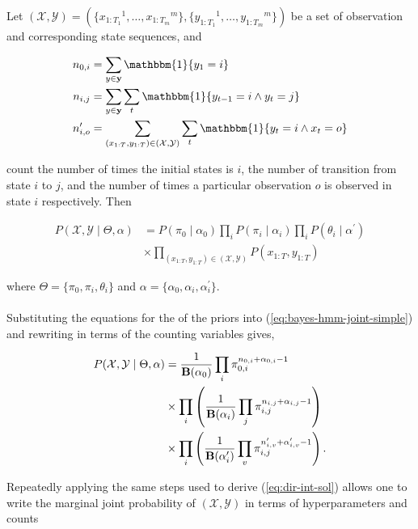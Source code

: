 \documentclass[12pt]{report}
\newcommand{\p}[0]{\prime}
\newcommand{\1}[0]{\mathbbm{1}}
\newcommand{\Bf}[0]{\text{\textbf{B}}}
\newcommand{\seq}[3]{\ensuremath{#1_{{#2}:{#3}}}}
\begin{document}
Let $(\mathcal{X}, \mathcal{Y}) = (\{\seq{x}{1}{T_1}^1, \ldots, \seq{x}{1}{T_m}^m\},
\{\seq{y}{1}{T_1}^1, \ldots, \seq{y}{1}{T_m}^m\})$ be a set of
observation and corresponding state sequences, and

\begin{align*}
    n_{0, i} &= \sum_{y \in \mathbf{y}} \1\{y_1 = i\} \\
    n_{i, j} &= \sum_{y \in \mathbf{y}} \sum_{t} \1\{y_{t-1} = i \wedge y_t = j\} \\
    n_{i, o}^\p &= \sum_{(\seq{x}{1}{T},\seq{y}{1}{T}) \in (\mathcal{X},\mathcal{Y})} \sum_{t} \1\{y_t = i \wedge x_t = o\} \\
\end{align*}

count the number of times the initial states is $i$, the number of transition from state $i$ to $j$,
and the number of times a particular observation $o$ is observed in state $i$ respectively. Then

\begin{align}  \label{eq:bayes-hmm-joint-simple}
 P(\mathcal{X}, \mathcal{Y} \mid \Theta, \alpha)
 &=  P(\pi_0 \mid \alpha_0) \prod_i P(\pi_i \mid \alpha_i) \prod_i P(\theta_i \mid \alpha^\prime) \nonumber\\
 & \times \prod_{(\seq{x}{1}{T},\seq{y}{1}{T}) \in (\mathcal{X},\mathcal{Y})} P(\seq{x}{1}{T},\seq{y}{1}{T})
\end{align}

where $\Theta = \{\pi_0, \pi_i, \theta_i\}$ and $\alpha = \{\alpha_0, \alpha_i, \alpha_i^\prime\}$.
\\\\
Substituting the equations for the of the priors into (\ref{eq:bayes-hmm-joint-simple})
and rewriting in terms of the counting variables gives,

\begin{align} \label{eq:bayes-hmm-joint-full}
    P(\mathcal{X}, \mathcal{Y} \mid \Theta, \alpha)
    &= \frac{1}{\Bf(\alpha_0)} \prod_{i} \pi_{0,i}^{n_{0,i} + \alpha_{0,i} - 1} \nonumber \\
    & \times \prod_i \left(\frac{1}{\Bf(\alpha_i)} \prod_{j} \pi_{i,j}^{n_{i,j} + \alpha_{i,j} - 1}\right) \nonumber \\
    & \times \prod_i \left(\frac{1}{\Bf(\alpha_i^\prime)} \prod_{v} \pi_{i,j}^{n_{i,v}^\prime + \alpha_{i,v}^\prime - 1}\right).
\end{align}

Repeatedly applying the same steps used to derive (\ref{eq:dir-int-sol})
allows one to write the marginal joint probability of $(\mathcal{X}, \mathcal{Y})$
in terms of hyperparameters and counts
\end{document}
